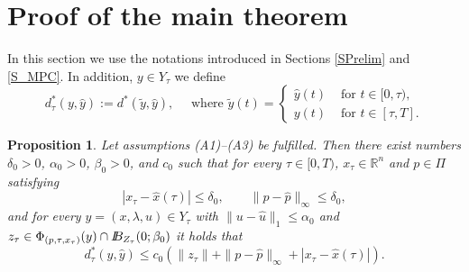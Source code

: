 \documentclass[11pt]{article}
\newtheorem{prop}[theo]{Proposition}
\newcommand{\bd}{\begin{displaymath}}
\newcommand{\ed}{\end{displaymath}}
\newcommand{\be}{\begin{equation}}
\newcommand{\ee}{\end{equation}}
\newcommand{\B}{I\kern -.35em B}
\newcommand{\R}{\mathbb R}
\newcommand{\al}{\alpha}
\def\R{\mathbb{R}}
\begin{document}
\section{Proof of the main theorem} \label{Sproof}

In this section we use the notations introduced in Sections \ref{SPrelim} and \ref{S_MPC}.
In addition, $y \in Y_\tau$ we define
\bd
          d_\tau^*(y, \hat y) := d^*(\tilde y, \hat y), \quad \mbox{ where } 
               \tilde y(t) = \left\{ \begin{array}{cl}
                            \hat y(t) & \mbox{ for } t \in [0,\tau), \\ 
                             y(t)   & \mbox{ for } t \in [\tau, T].
                                \end{array} \right. 
\ed

\begin{prop} \label{Pmain_error}
Let assumptions (A1)--(A3) be fulfilled. Then there exist numbers $\delta_0 > 0$, $\al_0 > 0$, $\beta_0 >0$,  
and $c_0$ such that for every $\tau \in [0,T)$, $x_\tau \in \R^n$ and $p \in \varPi$ satisfying
\be \label{Edelta0}
            | x_\tau - \hat x(\tau)| \leq \delta_0, \qquad \|p - \hat p \|_\infty \leq \delta_0,
\ee
and for every $y = (x, \lambda, u) \in Y_\tau$ with $\| u - \hat u \|_1 \leq \al_0$ and 
$z_\tau \in \Phi_{(p,\tau,x_\tau)}(y) \cap \B_{Z_\tau}(0;\beta_0)$ it holds that 
\bd
                  d_\tau^*(y,\hat y) \leq c_0 \left( \| z_\tau \| + \| p - \hat p \|_\infty + | x_\tau - \hat x(\tau) | \right).
\ed
\end{prop}
\end{document}
